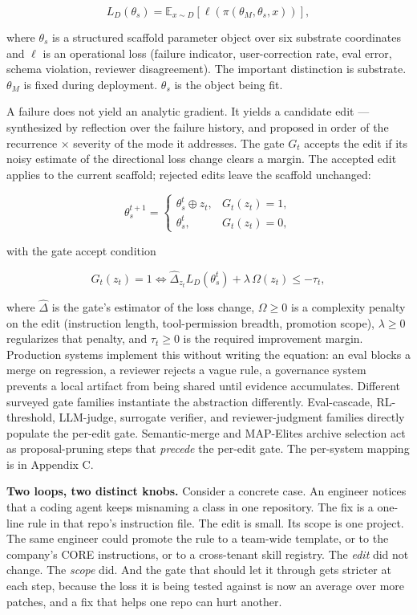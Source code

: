\documentclass[
]{article}
\begin{document}
\[L_D(\theta_s) = \mathbb{E}_{x \sim D}\!\left[\ell(\pi(\theta_M, \theta_s, x))\right],\]

where \(\theta_s\) is a structured scaffold parameter object over six
substrate coordinates and \(\ell\) is an operational loss (failure
indicator, user-correction rate, eval error, schema violation, reviewer
disagreement). The important distinction is substrate. \(\theta_M\) is
fixed during deployment. \(\theta_s\) is the object being fit.

A failure does not yield an analytic gradient. It yields a candidate
edit --- synthesized by reflection over the failure history, and
proposed in order of the recurrence × severity of the mode it addresses.
The gate \(G_t\) accepts the edit if its noisy estimate of the
directional loss change clears a margin. The accepted edit applies to
the current scaffold; rejected edits leave the scaffold unchanged:

\[\theta_s^{t+1} = \begin{cases} \theta_s^t \oplus z_t, & G_t(z_t)=1, \\ \theta_s^t, & G_t(z_t)=0, \end{cases}\]

with the gate accept condition

\[G_t(z_t)=1 \iff \widehat{\Delta}_{z_t} L_D(\theta_s^t) + \lambda\,\Omega(z_t) \leq -\tau_t,\]

where \(\widehat{\Delta}\) is the gate's estimator of the loss change,
\(\Omega \geq 0\) is a complexity penalty on the edit (instruction
length, tool-permission breadth, promotion scope), \(\lambda \geq 0\)
regularizes that penalty, and \(\tau_t \geq 0\) is the required
improvement margin. Production systems implement this without writing
the equation: an eval blocks a merge on regression, a reviewer rejects a
vague rule, a governance system prevents a local artifact from being
shared until evidence accumulates. Different surveyed gate families
instantiate the abstraction differently. Eval-cascade, RL-threshold,
LLM-judge, surrogate verifier, and reviewer-judgment families directly
populate the per-edit gate. Semantic-merge and MAP-Elites archive
selection act as proposal-pruning steps that \emph{precede} the per-edit
gate. The per-system mapping is in Appendix C.

\textbf{Two loops, two distinct knobs.} Consider a concrete case. An
engineer notices that a coding agent keeps misnaming a class in one
repository. The fix is a one-line rule in that repo's instruction file.
The edit is small. Its scope is one project. The same engineer could
promote the rule to a team-wide template, or to the company's CORE
instructions, or to a cross-tenant skill registry. The \emph{edit} did
not change. The \emph{scope} did. And the gate that should let it
through gets stricter at each step, because the loss it is being tested
against is now an average over more patches, and a fix that helps one
repo can hurt another.
\end{document}
